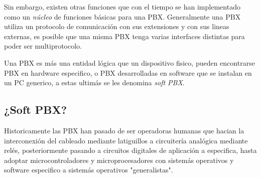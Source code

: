 Sin embargo, existen otras funciones que con el tiempo se han implementado como un \emph{núcleo} de funciones básicas para una PBX. Generalmente una PBX utiliza un protocolo de comunicación con sus extensiones y con sus lineas externas, es posible que una misma PBX tenga varias interfaces distintas para poder ser multiprotocolo.

Una PBX es más una entidad lógica que un dispositivo fisico, pueden encontrarse PBX en hardware especifico, o PBX desarrolladas en software que se instalan en un PC generico, a estas ultimás se les denomina \emph{soft PBX}.

\subsection{¿Soft PBX?}
\label{sec:centralita-basada-en}

Historicamente las PBX han pasado de ser operadoras humanas que hacian la interconexión del cableado mediante latiguillos a circuitería analógica mediante relés, posteriormente pasando a circuitos digitales de aplicación a especifica, hasta adoptar microcontroladores y microprocesadores con sistemás operativos y software especifico a sistemás operativos "generalistas".





